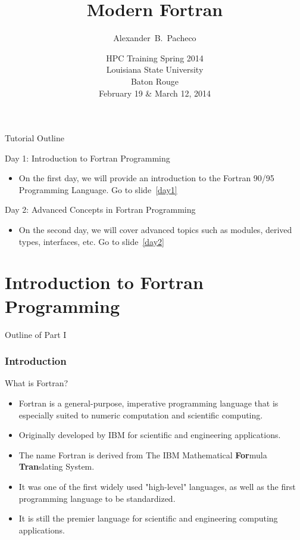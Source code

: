 \documentclass[c,mathserif,compress,xcolor=svgnames]{beamer}
\title{Modern Fortran}
\author[Alex Pacheco]{\large{Alexander~B.~Pacheco}}
\institute[HPC Training: Spring 2014] {\inst{}\footnotesize{User Services Consultant\\LSU HPC \& LONI\\sys-help@loni.org}}
\date[\insertframenumber/\inserttotalframenumber\hfill\hspace{1.5cm}]{\scriptsize{HPC Training Spring 2014\\Louisiana State University\\Baton Rouge\\February 19 \& March 12, 2014}}
\newenvironment{eblock}[0]
{
\begin{beamerboxesrounded}[upper=uppercol2,lower=lowercol2,shadow=true]}
{\end{beamerboxesrounded}}
\begin{document}
\frame{\titlepage}



\begin{frame}[c]{Tutorial Outline}
  \begin{eblock}{Day 1: Introduction to Fortran Programming}
    \begin{itemize}
      \item[] On the first day, we will provide an introduction to the Fortran 90/95 Programming Language. Go to slide~\ref{day1}
    \end{itemize}
  \end{eblock}
  \begin{eblock}{Day 2: Advanced Concepts in Fortran Programming}
    \begin{itemize}
      \item[] On the second day, we will cover advanced topics such as modules, derived types, interfaces, etc. Go to slide~\ref{day2}
    \end{itemize}
  \end{eblock}
\end{frame}

\part{Introduction to Fortran Programming}
\frame[label=day1]{\partpage}
\begin{frame}{Outline of Part I}
  \tableofcontents[part=1,hideallsubsections]
\end{frame}


\section{Introduction}
\begin{frame}{What is Fortran?}
  \begin{itemize}
    \item Fortran is a general-purpose, imperative programming language that is especially suited to numeric computation and scientific computing.
    \item Originally developed by IBM for scientific and engineering applications.
    \item The name Fortran is derived from The IBM Mathematical \textbf{For}mula \textbf{Tran}slating System.
    \item It was one of the first widely used "high-level" languages, as well as the first programming language to be standardized. 
    \item It is still the premier language for scientific and engineering computing applications.
  \end{itemize}
\end{frame}
\end{document}
